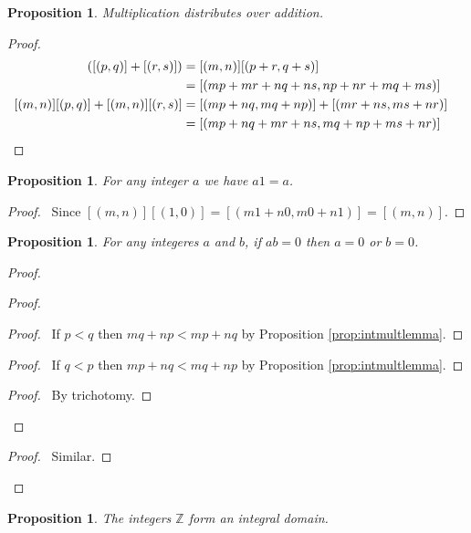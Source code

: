 \documentclass{book}
\let\qed\relax
\newtheorem{prop}[ax]{Proposition}
\theoremstyle{definition}
\begin{document}
\begin{prop}
\label{prop:timesZdist}
Multiplication distributes over addition.
\end{prop}

\begin{proof}
\pf
\begin{align*}
[(m,n)]([(p,q)]+[(r,s)]) & = [(m,n)][(p+r,q+s)] \\
& = [(mp+mr+nq+ns, np+nr+mq+ms)] \\
[(m,n)][(p,q)] + [(m,n)][(r,s)] & = [(mp+nq,mq+np)] + [(mr+ns,ms+nr)] \\
& = [(mp+nq+mr+ns,mq+np+ms+nr)] & \qed
\end{align*}
\end{proof}

\begin{prop}
\label{prop:timesZone}
For any integer $a$ we have $a1 = a$.
\end{prop}

\begin{proof}
\pf\ Since $[(m,n)][(1,0)] = [(m1+n0,m0+n1)] = [(m,n)]$. \qed
\end{proof}

\begin{prop}
\label{prop:Zno_zero_div}
For any integeres $a$ and $b$, if $ab = 0$ then $a = 0$ or $b = 0$.
\end{prop}

\begin{proof}
\pf
{}
\begin{proof}
	\begin{proof}
		\pf\ If $p < q$ then $mq+np < mp+nq$ by Proposition \ref{prop:intmultlemma}.
	\end{proof}
	\begin{proof}
		\pf\ If $q < p$ then $mp+nq < mq+np$ by Proposition \ref{prop:intmultlemma}.
	\end{proof}
	\begin{proof}
		\pf\ By trichotomy.
	\end{proof}
\end{proof}
\begin{proof}
	\pf\ Similar.
\end{proof}
\qed
\end{proof}

\begin{prop}
The integers $\mathbb{Z}$ form an integral domain.
\end{prop}
\end{document}
